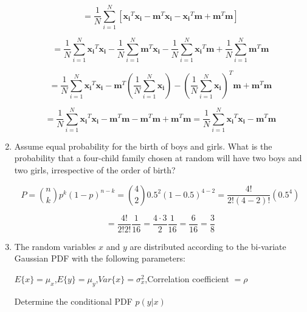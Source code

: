 \documentclass[fleqn]{article}
\begin{document}
\begin{enumerate}
		\begin{equation*}
			 = \frac{1}{N}\sum_{i=1}^{N}\left[\mathbf{x_i}^T\mathbf{x_i}-\mathbf{m}^T\mathbf{x_i}-\mathbf{x_i}^T\mathbf{m}+\mathbf{m}^T\mathbf{m}\right]
		\end{equation*}
		
		\begin{equation*}
			 = \frac{1}{N}\sum_{i=1}^{N}{\mathbf{x_i}^T\mathbf{x_i}}-\frac{1}{N}\sum_{i=1}^{N}{\mathbf{m}^T\mathbf{x_i}}-\frac{1}{N}\sum_{i=1}^{N}{\mathbf{x_i}^T\mathbf{m}}+\frac{1}{N}\sum_{i=1}^{N}{\mathbf{m}^T\mathbf{m}}
		\end{equation*}
				
		\begin{equation*}
			 = \frac{1}{N}\sum_{i=1}^{N}{\mathbf{x_i}^T\mathbf{x_i}}-\mathbf{m}^T\left(\frac{1}{N}\sum_{i=1}^{N}{\mathbf{x_i}}\right)-\left(\frac{1}{N}\sum_{i=1}^{N}{\mathbf{x_i}}\right)^T\mathbf{m}+\mathbf{m}^T\mathbf{m}
		\end{equation*}
		
		\begin{equation*}
			 = \frac{1}{N}\sum_{i=1}^{N}{\mathbf{x_i}^T\mathbf{x_i}}-\mathbf{m}^T\mathbf{m}-\mathbf{m}^T\mathbf{m}+\mathbf{m}^T\mathbf{m} = \frac{1}{N}\sum_{i=1}^{N}{\mathbf{x_i}^T\mathbf{x_i}}-\mathbf{m}^T\mathbf{m}
		\end{equation*}
		
		\item Assume equal probability for the birth of boys and girls. What is the probability that a four-child family chosen at random will have two boys and two girls, irrespective of the order of birth?
		
		\begin{equation*}
			P = \binom{n}{k}p^k(1-p)^{n-k} = \binom{4}{2}0.5^2(1-0.5)^{4-2} = \frac{4!}{2!(4-2)!}(0.5^4)
		\end{equation*}
		
		\begin{equation*}
			 = \frac{4!}{2!2!}\frac{1}{16} = \frac{4 \cdot 3}{2}\frac{1}{16} = \frac{6}{16} = \frac{3}{8}
		\end{equation*}
		
		\item The random variables $x$ and $y$ are distributed according to the bi-variate Gaussian PDF with the following parameters:
		
		$E\{x\} = \mu_x$,\quad$E\{y\} = \mu_y$,\quad$Var\{x\} = \sigma_x^2$,\quad Correlation coefficient $ = \rho$
		
		Determine the conditional PDF $p(y|x)$
		

\end{enumerate}
\end{document}

